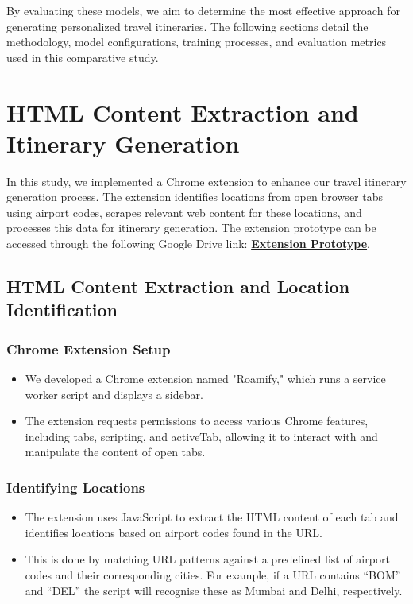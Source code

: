 \documentclass[conference]{IEEEtran}
\begin{document}
    By evaluating these models, we aim to determine the most effective approach for generating personalized travel itineraries. The following sections detail the methodology, model configurations, training processes, and evaluation metrics used in this comparative study.

\section{HTML Content Extraction and Itinerary Generation}

    In this study, we implemented a Chrome extension to enhance our travel itinerary generation process. The extension identifies locations from open browser tabs using airport codes, scrapes relevant web content for these locations, and processes this data for itinerary generation.
    The extension prototype can be accessed through the following Google Drive link: \href{https://drive.google.com/file/d/1qkj995W8CXmMslBy-55xUxxnHPPIOsoV/view?usp=sharing}{\textbf{Extension Prototype}}.

    \subsection{HTML Content Extraction and Location Identification}

        \subsubsection{Chrome Extension Setup}
        \begin{itemize}
            \item We developed a Chrome extension named "Roamify," which runs a service worker script and displays a sidebar.
            \item The extension requests permissions to access various Chrome features, including tabs, scripting, and activeTab, allowing it to interact with and manipulate the content of open tabs.
        \end{itemize}

        \subsubsection{Identifying Locations}
        \begin{itemize}
            \item The extension uses JavaScript to extract the HTML content of each tab and identifies locations based on airport codes found in the URL.
            \item This is done by matching URL patterns against a predefined list of airport codes and their corresponding cities. For example, if a URL contains “BOM” and “DEL” the script will recognise these as Mumbai and Delhi, respectively.
        \end{itemize}
\end{document}
